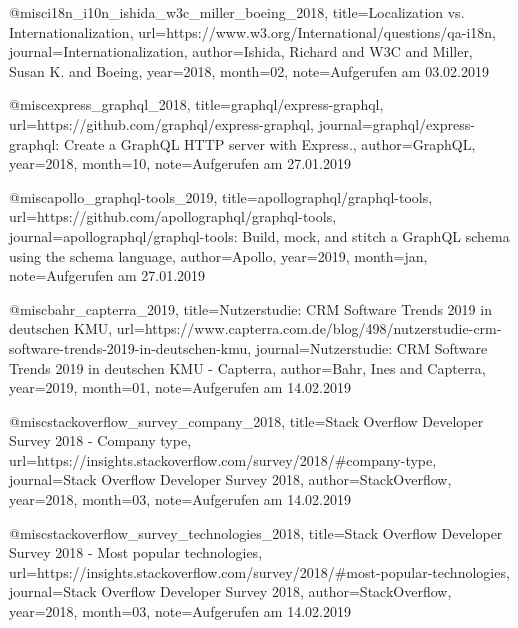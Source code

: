 
@misc{i18n_i10n_ishida_w3c_miller_boeing_2018, title={Localization vs. Internationalization}, url={https://www.w3.org/International/questions/qa-i18n}, journal={Internationalization}, author={Ishida, Richard and W3C and Miller, Susan K. and Boeing}, year={2018}, month={02}, note={Aufgerufen am 03.02.2019}}

@misc{express_graphql_2018, title={graphql/express-graphql}, url={https://github.com/graphql/express-graphql}, journal={graphql/express-graphql: Create a GraphQL HTTP server with Express.}, author={GraphQL}, year={2018}, month={10}, note={Aufgerufen am 27.01.2019}}

@misc{apollo_graphql-tools_2019, title={apollographql/graphql-tools}, url={https://github.com/apollographql/graphql-tools}, journal={apollographql/graphql-tools: Build, mock, and stitch a GraphQL schema using the schema language}, author={Apollo}, year={2019}, month={jan}, note={Aufgerufen am 27.01.2019}}

@misc{bahr_capterra_2019, title={Nutzerstudie: CRM Software Trends 2019 in deutschen KMU}, url={https://www.capterra.com.de/blog/498/nutzerstudie-crm-software-trends-2019-in-deutschen-kmu}, journal={Nutzerstudie: CRM Software Trends 2019 in deutschen KMU - Capterra}, author={Bahr, Ines and Capterra}, year={2019}, month={01}, note={Aufgerufen am 14.02.2019}}

@misc{stackoverflow_survey_company_2018, title={Stack Overflow Developer Survey 2018 - Company type}, url={https://insights.stackoverflow.com/survey/2018/#company-type}, journal={Stack Overflow Developer Survey 2018}, author={StackOverflow}, year={2018}, month={03}, note={Aufgerufen am 14.02.2019}}

@misc{stackoverflow_survey_technologies_2018, title={Stack Overflow Developer Survey 2018 - Most popular technologies}, url={https://insights.stackoverflow.com/survey/2018/#most-popular-technologies}, journal={Stack Overflow Developer Survey 2018}, author={StackOverflow}, year={2018}, month={03}, note={Aufgerufen am 14.02.2019}}